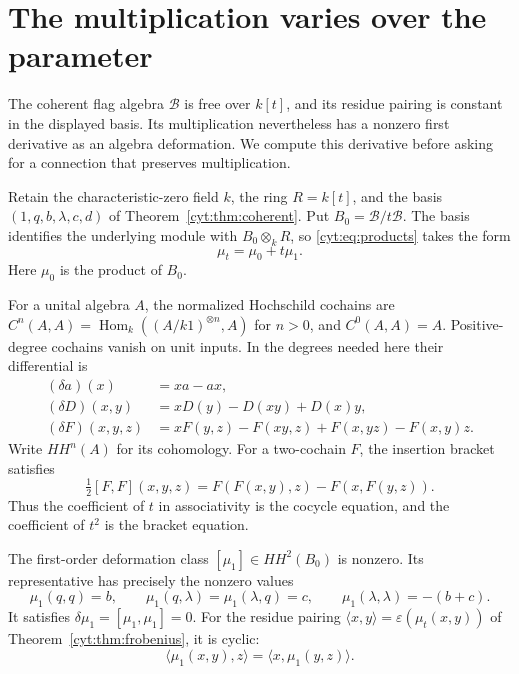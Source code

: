 \section{The multiplication varies over the parameter}
\label{cyd:section}

The coherent flag algebra \(\mathcal B\) is free over \(k[t]\),
and its residue pairing is constant in the displayed basis.
Its multiplication nevertheless has a nonzero first derivative
as an algebra deformation. We compute this derivative before
asking for a connection that preserves multiplication.

Retain the characteristic-zero field \(k\), the ring \(R=k[t]\),
and the basis \((1,q,b,\lambda,c,d)\) of
Theorem~\ref{cyt:thm:coherent}. Put \(B_0=\mathcal B/t\mathcal B\).
The basis identifies the underlying module with \(B_0\otimes_kR\),
so \eqref{cyt:eq:products} takes the form
\[
                         \mu_t=\mu_0+t\mu_1.
\]
Here \(\mu_0\) is the product of \(B_0\).

For a unital algebra \(A\), the normalized Hochschild cochains are
\(C^n(A,A)=\operatorname{Hom}_k((A/k1)^{\otimes n},A)\) for
\(n>0\), and \(C^0(A,A)=A\). Positive-degree cochains vanish
on unit inputs. In the degrees needed here their differential is
\begin{align*}
 (\delta a)(x)&=xa-ax,\\
 (\delta D)(x,y)&=xD(y)-D(xy)+D(x)y,\\
 (\delta F)(x,y,z)&=xF(y,z)-F(xy,z)+F(x,yz)-F(x,y)z.
\end{align*}
Write \(HH^n(A)\) for its cohomology. For a two-cochain \(F\),
the insertion bracket satisfies
\[
 \tfrac12[F,F](x,y,z)=F(F(x,y),z)-F(x,F(y,z)).
\]
Thus the coefficient of \(t\) in associativity is the cocycle
equation, and the coefficient of \(t^2\) is the bracket equation.

\begin{proposition}\label{cyd:prop:deformation}
The first-order deformation class \([\mu_1]\in HH^2(B_0)\)
is nonzero. Its representative has precisely the nonzero values
\begin{equation}\label{cyd:eq:class}
 \mu_1(q,q)=b,\qquad
 \mu_1(q,\lambda)=\mu_1(\lambda,q)=c,\qquad
 \mu_1(\lambda,\lambda)=-(b+c).
\end{equation}
It satisfies \(\delta\mu_1=[\mu_1,\mu_1]=0\).
For the residue pairing
\(\langle x,y\rangle=\varepsilon(\mu_t(x,y))\) of
Theorem~\ref{cyt:thm:frobenius}, it is cyclic:
\[
            \langle\mu_1(x,y),z\rangle
                 =\langle x,\mu_1(y,z)\rangle.
\]
\end{proposition}

